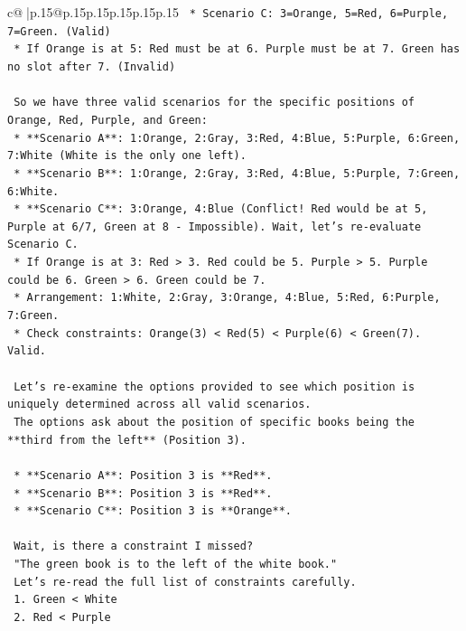 \documentclass{article}
\begin{document}
{\begin{supertabular}{c@{$\;$}|p{.15\linewidth}@{}p{.15\linewidth}p{.15\linewidth}p{.15\linewidth}p{.15\linewidth}p{.15\linewidth}}
{{{\texttt{        *   Scenario C: 3=Orange, 5=Red, 6=Purple, 7=Green. (Valid)} \\
\texttt{    *   If Orange is at 5: Red must be at 6. Purple must be at 7. Green has no slot after 7. (Invalid)} \\
\\ 
\texttt{    So we have three valid scenarios for the specific positions of Orange, Red, Purple, and Green:} \\
\texttt{    *   **Scenario A**: 1:Orange, 2:Gray, 3:Red, 4:Blue, 5:Purple, 6:Green, 7:White (White is the only one left).} \\
\texttt{    *   **Scenario B**: 1:Orange, 2:Gray, 3:Red, 4:Blue, 5:Purple, 7:Green, 6:White.} \\
\texttt{    *   **Scenario C**: 3:Orange, 4:Blue (Conflict! Red would be at 5, Purple at 6/7, Green at 8 {-} Impossible). Wait, let's re{-}evaluate Scenario C.} \\
\texttt{        *   If Orange is at 3: Red > 3. Red could be 5. Purple > 5. Purple could be 6. Green > 6. Green could be 7.} \\
\texttt{        *   Arrangement: 1:White, 2:Gray, 3:Orange, 4:Blue, 5:Red, 6:Purple, 7:Green.} \\
\texttt{        *   Check constraints: Orange(3) < Red(5) < Purple(6) < Green(7). Valid.} \\
\\ 
\texttt{    Let's re{-}examine the options provided to see which position is uniquely determined across all valid scenarios.} \\
\texttt{    The options ask about the position of specific books being the **third from the left** (Position 3).} \\
\\ 
\texttt{    *   **Scenario A**: Position 3 is **Red**.} \\
\texttt{    *   **Scenario B**: Position 3 is **Red**.} \\
\texttt{    *   **Scenario C**: Position 3 is **Orange**.} \\
\\ 
\texttt{    Wait, is there a constraint I missed?} \\
\texttt{    "The green book is to the left of the white book."} \\
\texttt{    Let's re{-}read the full list of constraints carefully.} \\
\texttt{    1. Green < White} \\
\texttt{    2. Red < Purple} \\
}}}
\end{supertabular}}
\end{document}
